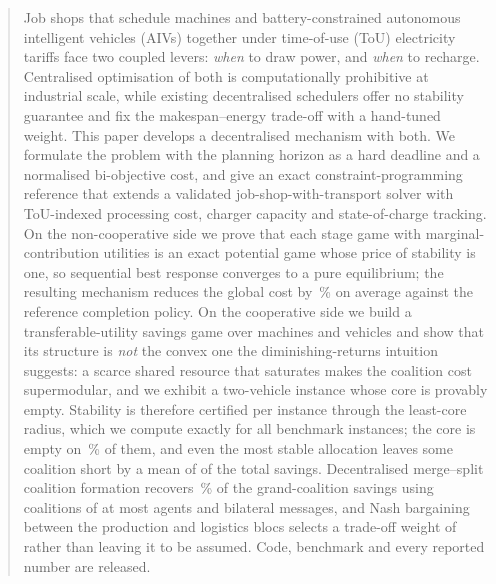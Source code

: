 \documentclass[preprint, 3p, review, 12pt]{elsarticle}
\theoremstyle{definition}
\begin{document}
\begin{frontmatter}
\begin{abstract}
Job shops that schedule machines and battery-constrained autonomous intelligent vehicles
(AIVs) together under time-of-use (ToU) electricity tariffs face two coupled levers:
\emph{when} to draw power, and \emph{when} to recharge. Centralised optimisation of both is
computationally prohibitive at industrial scale, while existing decentralised schedulers
offer no stability guarantee and fix the makespan--energy trade-off with a hand-tuned
weight. This paper develops a decentralised mechanism with both. We formulate the problem
with the planning horizon as a hard deadline and a normalised bi-objective cost, and give
an exact constraint-programming reference that extends a validated job-shop-with-transport
solver with ToU-indexed processing cost, charger capacity and state-of-charge tracking. On
the non-cooperative side we prove that each stage game with marginal-contribution utilities
is an exact potential game whose price of stability is one, so sequential best response
converges to a pure equilibrium; the resulting mechanism reduces the global cost by
\,\% on average against the reference completion policy. On the
cooperative side we build a transferable-utility savings game over machines and vehicles and
show that its structure is \emph{not} the convex one the diminishing-returns intuition
suggests: a scarce shared resource that saturates makes the coalition cost supermodular, and
we exhibit a two-vehicle instance whose core is provably empty. Stability is therefore
certified per instance through the least-core radius, which we compute exactly for all
 benchmark instances; the core is empty on
\,\% of them, and even the most stable allocation leaves some
coalition short by a mean of  of the total savings.
Decentralised merge--split coalition formation recovers
\,\% of the grand-coalition savings using coalitions of at most
 agents and  bilateral messages, and Nash
bargaining between the production and logistics blocs selects a trade-off weight of
 rather than leaving it to be assumed. Code, benchmark and every
reported number are released.
\end{abstract}

\begin{graphicalabstract}
\end{graphicalabstract}


\end{frontmatter}
\end{document}
